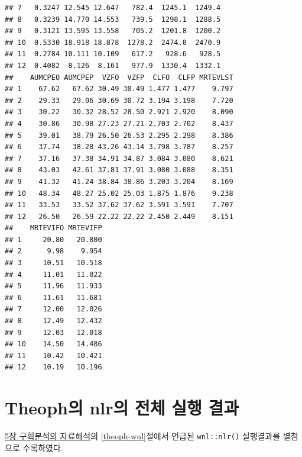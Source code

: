 \documentclass[
  11pt,
  krantz2, a4paper, twoside]{krantz}
\theoremstyle{definition}
\theoremstyle{definition}
\theoremstyle{definition}
\theoremstyle{definition}
\theoremstyle{remark}
\begin{document}
\begin{verbatim}
## 7   0.3247 12.545 12.647   782.4  1245.1  1249.4
## 8   0.3239 14.770 14.553   739.5  1298.1  1288.5
## 9   0.3121 13.595 13.558   705.2  1201.8  1200.2
## 10  0.5330 18.918 18.878  1278.2  2474.0  2470.9
## 11  0.2784 10.111 10.109   617.2   928.6   928.5
## 12  0.4082  8.126  8.161   977.9  1330.4  1332.1
##    AUMCPEO AUMCPEP  VZFO  VZFP  CLFO  CLFP MRTEVLST
## 1    67.62   67.62 30.49 30.49 1.477 1.477    9.797
## 2    29.33   29.06 30.69 30.72 3.194 3.198    7.720
## 3    30.22   30.32 28.52 28.50 2.921 2.920    8.090
## 4    30.86   30.98 27.23 27.21 2.703 2.702    8.437
## 5    39.01   38.79 26.50 26.53 2.295 2.298    8.386
## 6    37.74   38.28 43.26 43.14 3.798 3.787    8.257
## 7    37.16   37.38 34.91 34.87 3.084 3.080    8.621
## 8    43.03   42.61 37.81 37.91 3.080 3.088    8.351
## 9    41.32   41.24 38.84 38.86 3.203 3.204    8.169
## 10   48.34   48.27 25.02 25.03 1.875 1.876    9.238
## 11   33.53   33.52 37.62 37.62 3.591 3.591    7.707
## 12   26.50   26.59 22.22 22.22 2.450 2.449    8.151
##    MRTEVIFO MRTEVIFP
## 1     20.80   20.800
## 2      9.98    9.954
## 3     10.51   10.518
## 4     11.01   11.022
## 5     11.96   11.933
## 6     11.61   11.681
## 7     12.00   12.026
## 8     12.49   12.432
## 9     12.03   12.018
## 10    14.50   14.486
## 11    10.42   10.421
## 12    10.19   10.196
\end{verbatim}

\normalsize

\hypertarget{Theoph_nlr}{%
\chapter{Theoph의 nlr의 전체 실행 결과}\label{Theoph_nlr}}

\protect\hyperlink{ca-analysis}{5장 구획분석의 자료해석}의 \ref{theoph-wnl}절에서 언급된 \texttt{wnl::nlr()} 실행결과를 별첨으로 수록하였다.

\tiny
\end{document}
